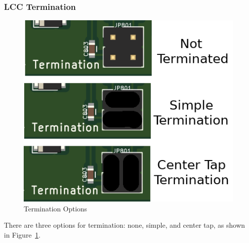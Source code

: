 \documentclass[12pt,twoside]{article}
\begin{document}
\subsubsection{LCC Termination}
\label{sect:termination}
\begin{figure}[hbpt]\begin{centering}%
\includegraphics{TerminationJumpers.png}
\caption{Termination Options}
\label{fig:termination}
\end{centering}\end{figure}

There are three options for termination: none, simple, and center tap, as 
shown in Figure~\ref{fig:termination}.
\end{document}
